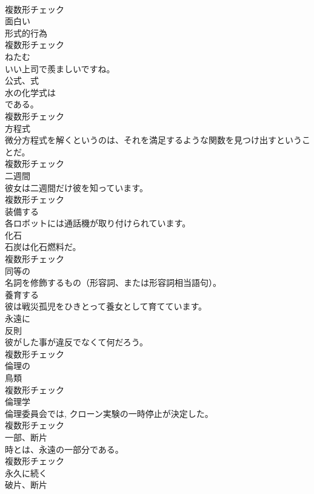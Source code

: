 \documentclass[8pt]{extreport}
\begin{document}
\begin{CJK}{UTF8}{min}
\\	複数形チェック
\\	[形容詞]	面白い	
\\	[名詞]	形式的行為	
\\	複数形チェック
\\	[形容詞]	ねたむ	
\\	いい上司で羨ましいですね。	
\\	[名詞]	公式、式	
\\	水の化学式は
\\	である。	
\\	複数形チェック
\\	[名詞]	方程式	
\\	微分方程式を解くというのは、それを満足するような関数を見つけ出すということだ。	
\\	複数形チェック
\\	[名詞]	二週間	
\\	彼女は二週間だけ彼を知っています。	
\\	複数形チェック
\\	[動詞]	装備する	
\\	各ロボットには通話機が取り付けられています。	
\\	[名詞]	化石	
\\	石炭は化石燃料だ。	
\\	複数形チェック
\\	[形容詞]	同等の	
\\	名詞を修飾するもの（形容詞、または形容詞相当語句）。	
\\	[動詞]	養育する	
\\	彼は戦災孤児をひきとって養女として育てています。	
\\	[副詞]	永遠に	
\\	[名詞]	反則	
\\	彼がした事が違反でなくて何だろう。	
\\	複数形チェック
\\	[形容詞]	倫理の	
\\	[名詞]	鳥類	
\\	複数形チェック
\\	[名詞]	倫理学	
\\	倫理委員会では, クローン実験の一時停止が決定した。	
\\	複数形チェック
\\	[名詞]	一部、断片	
\\	時とは、永遠の一部分である。	
\\	複数形チェック
\\	[形容詞]	永久に続く	
\\	[名詞]	破片、断片	

\end{CJK}
\end{document}
